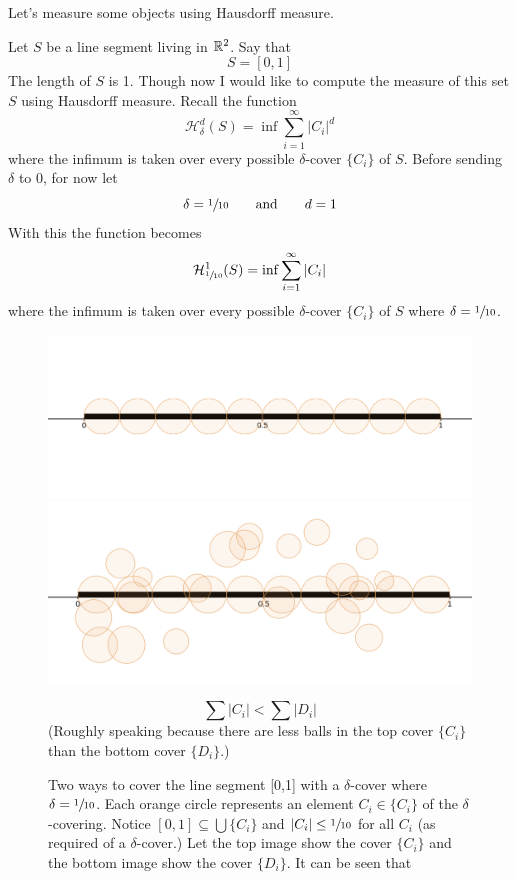 \documentclass[11pt]{ekblite}
\begin{document}
Let's measure some objects using Hausdorff measure.
\begin{example}
	Let $S$ be a line segment living in $\mathbb{R}^2$. Say that
	\[S = [0,1]\]
	The length of $S$ is 1. Though now I would like to compute the measure of this set $S$ using Hausdorff measure. Recall the function
	\[\mathcal{H}_{\delta}^d (S) = \inf \sum_{i=1}^{\infty} |C_i|^d\]
	where the infimum is taken over every possible $\delta$-cover $\{C_i\}$ of $S$. Before sending $\delta$ to 0, for now let
	\[\delta = \sfrac{1}{10} \qquad \text{and} \qquad d = 1\]
	With this the function becomes
	\[\mathcal{H}_{\sfrac{1}{10}}^{1} (S) = \inf \sum_{i=1}^{\infty} |C_i|\]
	where the infimum is taken over every possible $\delta$-cover $\{C_i\}$ of $S$ where $\delta = \sfrac{1}{10}$.
	\begin{figure}[h]
		\includegraphics[scale=0.25]{img/c19.jpg}
		\includegraphics[scale=0.26]{img/c18.jpg}
		\caption{Two ways to cover the line segment [0,1] with a $\delta$-cover where $\delta = \sfrac{1}{10}$. Each orange circle represents an element $C_i \in \{C_i\}$ of the $\delta$-covering. Notice $[0,1] \subseteq \bigcup \{C_i\}$ and $|C_i| \le \sfrac{1}{10}$ for all $C_i$ (as required of a $\delta$-cover.) Let the top image show the cover $\{C_i\}$ and the bottom image show the cover $\{D_i\}$. It can be seen that}
		\[\sum |C_i| < \sum |D_i|\]
		(Roughly speaking because there are less balls in the top cover $\{C_i\}$ than the bottom cover $\{D_i\}$.) 
		\label{fig:figure5}

\end{figure}
\end{example}
\end{document}
